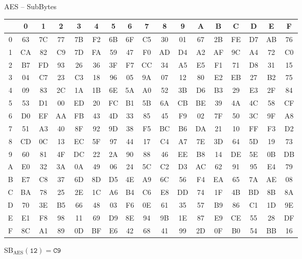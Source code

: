 \begin{frame}{AES -- SubBytes}
\begin{table}[]
\ttfamily
\small
\begin{tabular}{c|cccccccccccccccc}
 & 0 & 1 & 2 & 3 & 4 & 5 & 6 & 7 & 8 & 9 & A & B & C & D & E & F \\\hline
0 & 63 & 7C & 77 & 7B & F2 & 6B & 6F & C5 & 30 & 01 & 67 & 2B & FE & D7 & AB & 76 \\
1 & CA & 82 & C9 & 7D & FA & 59 & 47 & F0 & AD & D4 & A2 & AF & 9C & A4 & 72 & C0 \\
2 & B7 & FD & 93 & 26 & 36 & 3F & F7 & CC & 34 & A5 & E5 & F1 & 71 & D8 & 31 & 15 \\
3 & 04 & C7 & 23 & C3 & 18 & 96 & 05 & 9A & 07 & 12 & 80 & E2 & EB & 27 & B2 & 75 \\
4 & 09 & 83 & 2C & 1A & 1B & 6E & 5A & A0 & 52 & 3B & D6 & B3 & 29 & E3 & 2F & 84 \\
5 & 53 & D1 & 00 & ED & 20 & FC & B1 & 5B & 6A & CB & BE & 39 & 4A & 4C & 58 & CF \\
6 & D0 & EF & AA & FB & 43 & 4D & 33 & 85 & 45 & F9 & 02 & 7F & 50 & 3C & 9F & A8 \\
7 & 51 & A3 & 40 & 8F & 92 & 9D & 38 & F5 & BC & B6 & DA & 21 & 10 & FF & F3 & D2 \\
8 & CD & 0C & 13 & EC & 5F & 97 & 44 & 17 & C4 & A7 & 7E & 3D & 64 & 5D & 19 & 73 \\
9 & 60 & 81 & 4F & DC & 22 & 2A & 90 & 88 & 46 & EE & B8 & 14 & DE & 5E & 0B & DB \\
A & E0 & 32 & 3A & 0A & 49 & 06 & 24 & 5C & C2 & D3 & AC & 62 & 91 & 95 & E4 & 79 \\
B & E7 & C8 & 37 & 6D & 8D & D5 & 4E & A9 & 6C & 56 & F4 & EA & 65 & 7A & AE & 08 \\
C & BA & 78 & 25 & 2E & 1C & A6 & B4 & C6 & E8 & DD & 74 & 1F & 4B & BD & 8B & 8A \\
D & 70 & 3E & B5 & 66 & 48 & 03 & F6 & 0E & 61 & 35 & 57 & B9 & 86 & C1 & 1D & 9E \\
E & E1 & F8 & 98 & 11 & 69 & D9 & 8E & 94 & 9B & 1E & 87 & E9 & CE & 55 & 28 & DF \\
F & 8C & A1 & 89 & 0D & BF & E6 & 42 & 68 & 41 & 99 & 2D & 0F & B0 & 54 & BB & 16
\end{tabular}
\end{table}
    SB$_{\text{AES}}(\texttt{12})=\texttt{C9}$
\end{frame}

